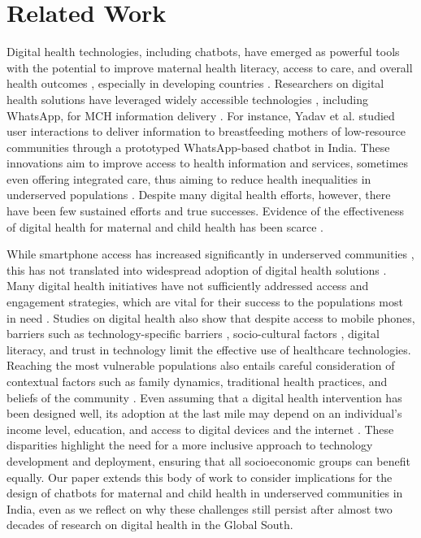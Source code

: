 \section{Related Work}
Digital health technologies, including chatbots, have emerged as powerful tools with the potential to improve maternal health literacy, access to care, and overall health outcomes \cite{b6,b7,b17}, especially in developing countries \cite{b18}. Researchers on digital health solutions have leveraged widely accessible technologies \cite{b24}, including WhatsApp, for MCH information delivery \cite{b6}. For instance, Yadav et al. studied \cite{22} user interactions to deliver information to breastfeeding mothers of low-resource communities through a prototyped WhatsApp-based chatbot in India.
These innovations aim to improve access to health information and services, sometimes even offering integrated care, thus aiming to reduce health inequalities in underserved populations \cite{b9}. 
Despite many digital health efforts, however, there have been few sustained efforts and true successes. Evidence of the effectiveness of digital health for maternal and child health has been scarce \cite{b25}.

While smartphone access has increased significantly in underserved communities \cite{b4}, this has not translated into widespread adoption of digital health solutions \cite{b19}.
Many digital health initiatives have not sufficiently addressed access and engagement strategies, which are vital for their success to the populations most in need \cite{b11}. 
Studies on digital health also show that despite access to mobile phones, barriers such as technology-specific barriers \cite{20}, socio-cultural factors \cite{21}, digital literacy, and trust in technology \cite{b19} limit the effective use of healthcare technologies. 
Reaching the most vulnerable populations also entails careful consideration of contextual factors such as family dynamics, traditional health practices, and beliefs of the community \cite{22}. 
Even assuming that a digital health intervention has been designed well, its adoption at the last mile may depend on an individual's income level, education, and access to digital devices and the internet \cite{b10}.  
These disparities highlight the need for a more inclusive approach to technology development and deployment, ensuring that all socioeconomic groups can benefit equally. 
Our paper extends this body of work to consider implications for the design of chatbots for maternal and child health in underserved communities in India, even as we reflect on why these challenges still persist after almost two decades of research on digital health in the Global South. 
 
